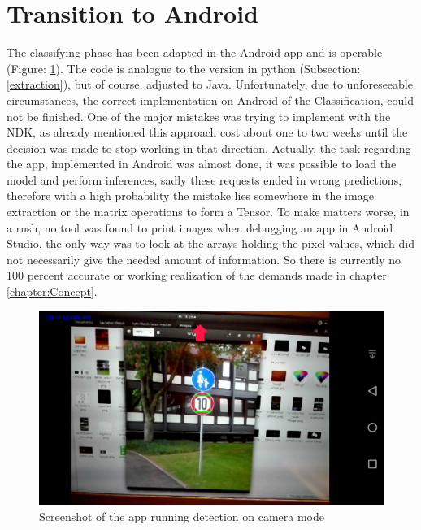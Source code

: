 \section{Transition to Android}
The classifying phase has been adapted in the Android app and is operable (Figure: \ref{fig:screenfun}). The code is analogue to the version in python (Subsection: \ref{extraction}), but of course, adjusted to Java. 
Unfortunately, due to unforeseeable circumstances, the correct implementation on Android of the Classification, could not be finished. One of the major mistakes was trying to implement with the NDK, as already mentioned this approach cost about one to two weeks until the decision was made to stop working in that direction.\newline 
Actually, the task regarding the app, implemented in Android was almost done, it was possible to load the model and perform inferences, sadly these requests ended in wrong predictions, therefore with a high probability the mistake lies somewhere in the image extraction or the matrix operations to form a Tensor. To make matters worse, in a rush, no tool was found to print images when debugging an app in Android Studio, the only way was to look at the arrays holding the pixel values, which did not necessarily give the needed amount of information. So there is currently no 100 percent accurate or working realization of the demands made in chapter \ref{chapter:Concept}. 
\newline

\begin{figure}[H]
	\centering
	\includegraphics[width=\linewidth]{images/screenshotfun.png}
	\caption{Screenshot of the app running detection on camera mode}\label{fig:screenfun}
\end{figure}